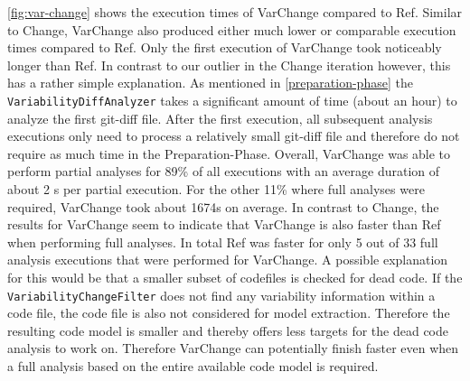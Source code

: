 \documentclass[a4paper]{article}
\begin{document}
\autoref{fig:var-change} shows the execution times of \textcolor{blue!80!black}{VarChange} compared to \textcolor{gray!80!black}{Ref}. Similar to Change, VarChange also produced either much lower or comparable execution times compared to Ref. Only the first execution of VarChange took noticeably longer than Ref. In contrast to our outlier in the Change iteration however, this has a rather simple explanation. As mentioned in \autoref{preparation-phase} the \texttt{Variability\-Diff\-Analyzer} takes a significant amount of time (about an hour) to analyze the first git-diff file. After the first execution, all subsequent analysis executions only need to process a relatively small git-diff file and therefore do not require as much time in the Preparation-Phase.  Overall, VarChange was able to perform partial analyses for 89\% of all executions with an average duration of about 2 s per partial execution. For the other 11\% where full analyses were required, VarChange took about 1674s on average. In contrast to Change, the results for VarChange seem to indicate that VarChange is also faster than Ref when performing full analyses. In total Ref was faster for only 5 out of 33 full analysis executions that were performed for VarChange. A possible explanation for this would be that a smaller subset of codefiles is checked for dead code. If the \texttt{VariabilityChangeFilter} does not find any variability information within a code file, the code file is also not considered for model extraction. Therefore the resulting code model is smaller and thereby offers less targets for the dead code analysis to work on. Therefore VarChange can potentially finish faster even when a full analysis based on the entire available code model is required.
\end{document}
